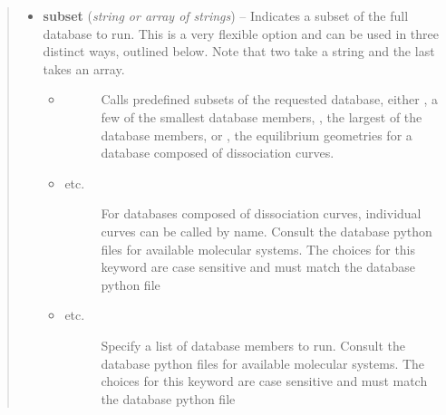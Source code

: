 \documentclass[letterpaper,10pt,english]{sphinxmanual}
\begin{document}
\begin{fulllineitems}
\begin{quote}
\begin{description}
\begin{itemize}
\item {} 
\textbf{subset} (\emph{string or array of strings}) -- 
Indicates a subset of the full database to run. This is a very
flexible option and can be used in three distinct ways, outlined
below. Note that two take a string and the last takes an array.
\begin{itemize}
\item {} \begin{description}
\item[{ \textbar{}\textbar{}  \textbar{}\textbar{} }] \leavevmode
Calls predefined subsets of the requested database, either
, a few of the smallest database members,
, the largest of the database members, or
, the equilibrium geometries for a database
composed of dissociation curves.

\end{description}

\item {} \begin{description}
\item[{ \textbar{}\textbar{}  \textbar{}\textbar{}  \textbar{}\textbar{} etc.}] \leavevmode
For databases composed of dissociation curves, individual
curves can be called by name. Consult the database python
files for available molecular systems.  The choices for this
keyword are case sensitive and must match the database python file

\end{description}

\item {} \begin{description}
\item[{\code{{[}1,2,5{]}} \textbar{}\textbar{} \code{{[}'1','2','5'{]}} \textbar{}\textbar{}  \textbar{}\textbar{} etc.}] \leavevmode
Specify a list of database members to run. Consult the
database python files for available molecular systems.  The
choices for this keyword are case sensitive and must match the
database python file

\end{description}

\end{itemize}


\end{itemize}

\end{description}\end{quote}


\end{fulllineitems}
\end{document}
